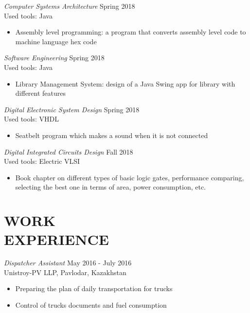 \documentclass[margin, 10pt]{res} %
\begin{document}
\begin{resume}
{\sl Computer Systems Architecture} \hfill Spring 2018 \\
Used tools: Java
\begin{itemize}
\item Assembly level programming: a program that converts assembly level code to machine language hex code
\end{itemize} 

{\sl Software Engineering} \hfill Spring 2018 \\
Used tools: Java
\begin{itemize}
\item Library Management System: design of a Java Swing app for library with different features
\end{itemize} 

{\sl Digital Electronic System Design} \hfill Spring 2018 \\
Used tools: VHDL
\begin{itemize}
\item Seatbelt program which makes a sound when it is not connected
\end{itemize} 

{\sl Digital Integrated Circuits Design} \hfill Fall 2018 \\
Used tools: Electric VLSI
\begin{itemize}
\item Book chapter on different types of basic logic gates, performance comparing, selecting the best one in terms of area, power consumption, etc.
\end{itemize} 

 
 
\section{WORK \\ EXPERIENCE}

{\sl Dispatcher Assistant} \hfill May 2016 - July 2016 \\
Unistroy-PV LLP, Pavlodar, Kazakhstan
\begin{itemize}
\item Preparing the plan of daily transportation for trucks
\item Control of trucks documents and fuel consumption
\end{itemize} 


\end{resume}
\end{document}
